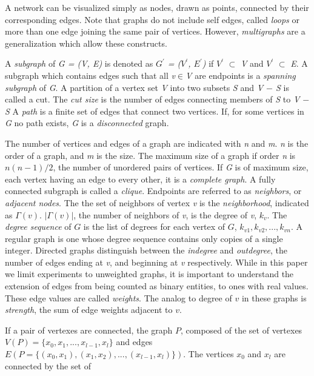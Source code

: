 A network can be visualized simply as nodes, drawn as points, connected by their corresponding edges. Note that graphs do not include self edges, called \textit{loops} or more than one edge joining the same pair of vertices. However, \textit{multigraphs} are a generalization which allow these constructs. 

A \textit{subgraph} of \textit{G = (V, E)} is denoted as \textit{$G^\prime$ = ($V^\prime$, $E^\prime$)} if \textit{$V^\prime$} $\subset$ \textit{V} and \textit{$V^\prime$} $\subset$ \textit{E}. A subgraph which contains edges such that all \textit{v}$\in$\textit{V} are endpoints is a \textit{spanning subgraph} of \textit{G}. 
A partition of a vertex set \textit{V} into two subsets \textit{S} and \textit{V $-$ S} is called a cut. The \textit{cut size} is the number of edges connecting members of \textit{S} to \textit{V $-$ S}
A \textit{path} is a finite set of edges that connect two vertices. If, for some vertices in \textit{G} no path exists, \textit{G} is a \textit{disconnected} graph.

The number of vertices and edges of a graph are indicated with \textit{n} and \textit{m}. \textit{n} is the order of a graph, and \textit{m} is the size. The maximum size of a graph if order \textit{n} is $n(n-1)/2$, the number of unordered pairs of vertices. If \textit{G} is of maximum size, each vertex having an edge to every other, it is a \textit{complete graph}. 
A fully connected subgraph is called a \textit{clique}. Endpoints are referred to as \textit{neighbors}, or \textit{adjacent nodes}. The the set of neighbors of vertex \textit{v} is the \textit{neighborhood}, indicated as \textit{$\Gamma(v)$}. $|\Gamma(v)|$, the number of neighbors of \textit{v}, is the degree of \textit{v}, $k_v$. The \textit{degree sequence} of $G$ is the list of degrees for each vertex of $G$, $k_{v1}, k_{v2},..., k_{vn}$. 
A regular graph is one whose degree sequence contains only copies of a single integer. Directed graphs distinguish between the \textit{indegree} and \textit{outdegree}, the number of edges ending at \textit{v}, and beginning at \textit{v} respectively. While in this paper we limit experiments to unweighted graphs, it is important to understand the extension of edges from being counted as binary entities, to ones with real values. These edge values are called \textit{weights}. The analog to degree of $v$ in these graphs is \textit{strength}, the sum of edge weights adjacent to $v$.


If a pair of vertexes are connected, the graph $P$, composed of the set of vertexes $V(P)=\{x_0, x_1, ..., x_{l-1}, x_l\}$ and edges $E(P=\{(x_0,x_1), (x_1,x_2), ...,(x_{l-1}, x_{l})\})$. The vertices $x_0$ and $x_l$ are connected by the set of 

